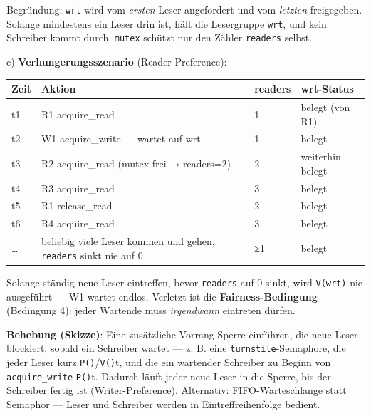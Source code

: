 \documentclass[11pt, a4paper]{article}
\begin{document}
Begründung: \texttt{wrt} wird vom \textit{ersten} Leser angefordert und vom \textit{letzten} freigegeben. Solange mindestens ein Leser drin ist, hält die Lesergruppe \texttt{wrt}, und kein Schreiber kommt durch. \texttt{mutex} schützt nur den Zähler \texttt{readers} selbst.


c) \textbf{Verhungerungsszenario} (Reader-Preference):



{\small
\begin{tabularx}{\linewidth}{XXXX}
\hline
\rowcolor{tableheadbg}
{\color{white}\textbf{Zeit}} & {\color{white}\textbf{Aktion}} & {\color{white}\textbf{readers}} & {\color{white}\textbf{wrt-Status}} \\[2pt]
\hline
\endhead
\hline
\endfoot
t1 & R1 acquire\_read & 1 & belegt (von R1) \\
t2 & W1 acquire\_write — wartet auf wrt & 1 & belegt \\
t3 & R2 acquire\_read (mutex frei → readers=2) & 2 & weiterhin belegt \\
t4 & R3 acquire\_read & 3 & belegt \\
t5 & R1 release\_read & 2 & belegt \\
t6 & R4 acquire\_read & 3 & belegt \\
… & beliebig viele Leser kommen und gehen, \texttt{readers} sinkt nie auf 0 & ≥1 & belegt \\
\end{tabularx}
}


Solange ständig neue Leser eintreffen, bevor \texttt{readers} auf 0 sinkt, wird \texttt{V(wrt)} nie ausgeführt — W1 wartet endlos. Verletzt ist die \textbf{Fairness-Bedingung} (Bedingung 4): jeder Wartende muss \textit{irgendwann} eintreten dürfen.


\textbf{Behebung (Skizze)}: Eine zusätzliche Vorrang-Sperre einführen, die neue Leser blockiert, sobald ein Schreiber wartet — z. B. eine \texttt{turnstile}-Semaphore, die jeder Leser kurz \texttt{P()}/\texttt{V()}t, und die ein wartender Schreiber zu Beginn von \texttt{acquire\_write} \texttt{P()}t. Dadurch läuft jeder neue Leser in die Sperre, bis der Schreiber fertig ist (Writer-Preference). Alternativ: FIFO-Warteschlange statt Semaphor — Leser und Schreiber werden in Eintreffreihenfolge bedient.





\end{document}
